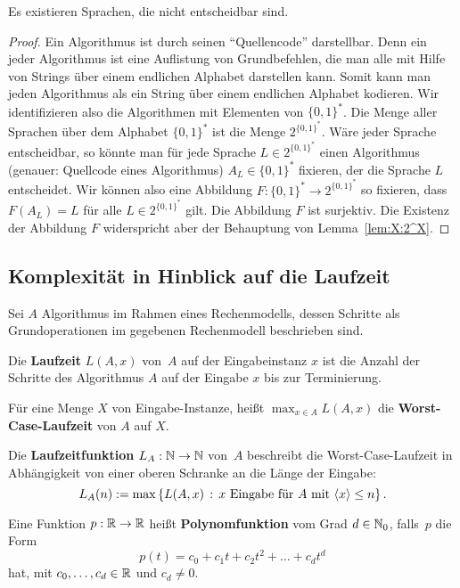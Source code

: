 \begin{thm}
	Es existieren Sprachen, die nicht entscheidbar sind. 
\end{thm} 
\begin{proof} 
		Ein Algorithmus ist durch seinen ``Quellencode'' darstellbar. Denn ein jeder Algorithmus ist eine Auflistung von Grundbefehlen, die man alle mit Hilfe von Strings über einem endlichen Alphabet darstellen kann. Somit kann  man jeden Algorithmus als ein String über einem endlichen Alphabet kodieren. Wir identifizieren also die Algorithmen mit Elementen von $\{0,1\}^\ast$. Die Menge aller Sprachen über dem Alphabet $\{0,1\}^\ast$ ist die Menge $2^{\{0,1\}^\ast}$. Wäre jeder Sprache entscheidbar, so könnte man für jede Sprache $L \in 2^{\{0,1\}^\ast}$ einen Algorithmus (genauer: Quellcode eines Algorithmus) $A_L \in \{0,1\}^\ast$ fixieren, der die Sprache $L$ entscheidet. Wir können also eine Abbildung $F : \{0,1\}^\ast \to 2^{\{0,1\}^\ast}$ so fixieren, dass $F(A_L) = L$ für alle $L \in 2^{\{0,1\}^\ast}$ gilt. Die Abbildung $F$ ist surjektiv. Die Existenz der Abbildung $F$ widerspricht aber der Behauptung von Lemma~\ref{lem:X:2^X}.
\end{proof} 

\subsection{Komplexität in Hinblick auf die Laufzeit} 

\begin{defn} 
	Sei $A$ Algorithmus im Rahmen eines Rechenmodells, dessen Schritte als Grundoperationen im gegebenen Rechenmodell beschrieben sind. 

Die \textbf{Laufzeit} $L(A,x)$ von~$A$ auf der Eingabeinstanz $x$ ist die Anzahl der Schritte des Algorithmus $A$ auf der Eingabe $x$ bis zur Terminierung. 

Für eine Menge $X$ von Eingabe-Instanze, heißt $\max_{x \in A} L(A,x)$ die \textbf{Worst-Case-Laufzeit} von $A$ auf $X$. 

Die \textbf{Laufzeitfunktion} $L_A : \mathbb{N} \to \mathbb{N}$ von~$A$ beschreibt die Worst-Case-Laufzeit in Abhängigkeit von einer oberen Schranke an die Länge der Eingabe: 
\[
L_A(n) := \max \setcond{  L(A,x) }{x \ \text{Eingabe für} \ A  \ \text{mit} \ \encl{x} \le n}.
\]
\end{defn} 

\begin{defn}
	Eine Funktion $p : \mathbb{R} \to \mathbb{R}$ heißt \textbf{Polynomfunktion} vom Grad $d \in \mathbb{N}_0$, falls~$p$ die Form \[
		p(t)= c_0 + c_1 t + c_2 t^2 + \ldots + c_d t^d
	\]
	hat, mit $c_0,\ldots,c_d \in \mathbb{R}$ und $c_d \ne 0$. 
\end{defn} 

